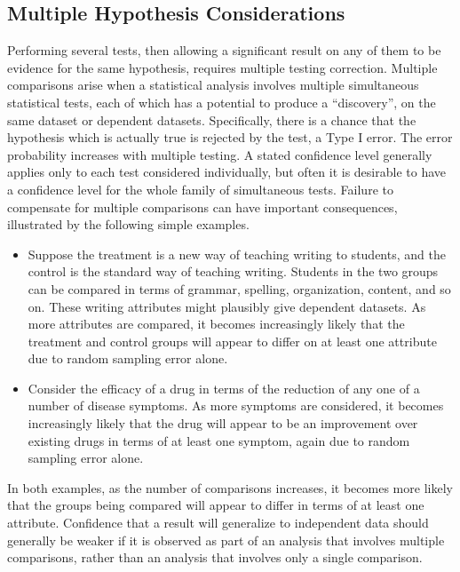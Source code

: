 \documentclass[12pt]{article}
\begin{document}
\subsection*{Multiple Hypothesis Considerations}

Performing several tests, then allowing a significant result on any of
them to be evidence for the same hypothesis, requires multiple testing
correction.  Multiple comparisons%
arise when a statistical analysis involves multiple simultaneous
statistical tests, each of which has a potential to produce a
``discovery'', on the same dataset or dependent datasets.  Specifically,
there is a chance that the hypothesis which is actually true is rejected
by the test, a Type I error.  The error probability increases with
multiple testing.  A stated confidence level generally applies only to
each test considered individually, but often it is desirable to have a
confidence level for the whole family of simultaneous tests.  Failure to
compensate for multiple comparisons can have important consequences,
illustrated by the following simple examples.
\begin{itemize}
    \item
        Suppose the treatment is a new way of teaching writing to
        students, and the control is the standard way of teaching
        writing.  Students in the two groups can be compared in terms of
        grammar, spelling, organization, content, and so on.  These
        writing attributes might plausibly give dependent datasets.  As
        more attributes are compared, it becomes increasingly likely
        that the treatment and control groups will appear to differ on
        at least one attribute due to random sampling error alone.
    \item
        Consider the efficacy of a drug in terms of the reduction of any
        one of a number of disease symptoms.  As more symptoms are
        considered, it becomes increasingly likely that the drug will
        appear to be an improvement over existing drugs in terms of at
        least one symptom, again due to random sampling error alone.
\end{itemize}
In both examples, as the number of comparisons increases, it becomes
more likely that the groups being compared will appear to differ in
terms of at least one attribute.  Confidence that a result will
generalize to independent data should generally be weaker if it is
observed as part of an analysis that involves multiple comparisons,
rather than an analysis that involves only a single comparison.
\end{document}
